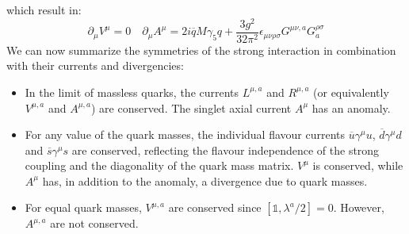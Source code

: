 \documentclass[../main.tex]{subfiles}
\begin{document}
which result in:
\[
\partial_\mu V^\mu=0 \quad
\partial_\mu A^\mu=2i\overline{q}M\gamma_5q+\frac{3g^2}{32\pi^2}\epsilon_{\mu\nu\rho\sigma}G^{\mu\nu,a}G^{\rho\sigma}_a
\]
We can now summarize the symmetries of the strong interaction in combination with their currents and divergencies:
\begin{itemize}
    \item In the limit of massless quarks, the currents $L^{\mu,a}$ and $R^{\mu,a}$ (or equivalently $V^{\mu,a}$ and $A^{\mu,a}$) are conserved. The singlet axial current $A^\mu$ has an anomaly.
    \item For any value of the quark masses, the individual flavour currents $\overline{u}\gamma^\mu u$, $\overline{d}\gamma^\mu d$ and $\overline{s}\gamma^\mu s$ are conserved, reflecting the flavour independence of the strong coupling and the diagonality of the quark mass matrix. $V^\mu$ is conserved, while $A^\mu$ has, in addition to the anomaly, a divergence due to quark masses.
    \item For equal quark masses, $V^{\mu,a}$ are conserved since $[\mathbb{1},\lambda^a/2]=0$. However, $A^{\mu,a}$ are not conserved.
\end{itemize}
\end{document}

